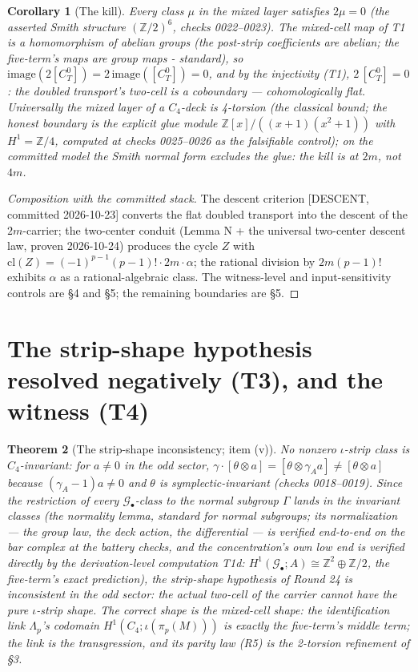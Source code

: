 \documentclass[11pt]{article}
\newtheorem{theorem}{Theorem}
\newtheorem{corollary}[theorem]{Corollary}
\newcommand{\GammaL}{\Gamma}
\newcommand{\Cfour}{C_4}
\newcommand{\Gbul}{\mathcal{G}_\bullet}
\newcommand{\Z}{\mathbb{Z}}
\begin{document}
\begin{corollary}[The kill]
Every class $\mu$ in the mixed layer satisfies $2\mu=0$ (the asserted
Smith structure $(\Z/2)^6$, checks 0022--0023). The mixed-cell map of
T1 is a homomorphism of abelian groups (the post-strip coefficients
are abelian; the five-term's maps are group maps - standard), so
$\mathrm{image}(2[C_T^0])=2\,\mathrm{image}([C_T^0])=0$, and by the
injectivity (T1), $2\,[C_T^0]=0$: the doubled transport's two-cell is
a coboundary — cohomologically flat. Universally the mixed layer of a
$\Cfour$-deck is 4-torsion (the classical bound; the honest boundary is
the explicit glue module $\Z[x]/((x{+}1)(x^2{+}1))$ with
$H^1=\Z/4$, computed at checks 0025--0026 as the falsifiable control); on the
committed model the Smith normal form excludes the glue: the kill is
at $2m$, not $4m$.
\end{corollary}

\begin{proof}[Composition with the committed stack]
The descent criterion [DESCENT, committed 2026-10-23] converts the flat
doubled transport into the descent of the $2m$-carrier; the two-center
conduit (Lemma N + the universal two-center descent law, proven
2026-10-24) produces the cycle $Z$ with
$\mathrm{cl}(Z)=(-1)^{p-1}(p-1)!\cdot 2m\cdot\alpha$; the rational
division by $2m(p-1)!$ exhibits $\alpha$ as a rational-algebraic class.
The witness-level and input-sensitivity controls are §4 and §5; the
remaining boundaries are §5.
\end{proof}

\section{The strip-shape hypothesis resolved negatively (T3), and the witness (T4)}

\begin{theorem}[The strip-shape inconsistency; item (v)]
No nonzero $\iota$-strip class is $\Cfour$-invariant: for
$a\ne 0$ in the odd sector, $\gamma\cdot[\theta\otimes a]=
[\theta\otimes\gamma_A a]\ne[\theta\otimes a]$ because
$(\gamma_A-1)a\ne 0$ and $\theta$ is symplectic-invariant
(checks 0018--0019). Since the restriction of every $\Gbul$-class to the
normal subgroup $\GammaL$ lands in the invariant classes (the
normality lemma, standard for normal subgroups; its normalization —
the group law, the deck action, the differential — is verified
end-to-end on the bar complex at the battery checks, and the
concentration's own low end is verified directly by the
derivation-level computation T1d: $H^1(\Gbul;A)\cong\Z^2\oplus\Z/2$,
the five-term's exact prediction), \emph{the strip-shape hypothesis
of Round 24 is inconsistent in the odd sector}: the actual two-cell of
the carrier cannot have the pure $\iota$-strip shape. The correct shape
is the \emph{mixed-cell} shape: the identification link
$\Lambda_p$'s codomain $H^1(\Cfour;\iota(\pi_p(M)))$ is exactly the
five-term's middle term; the link is the transgression, and its parity
law (R5) is the 2-torsion refinement of §3.
\end{theorem}
\end{document}
